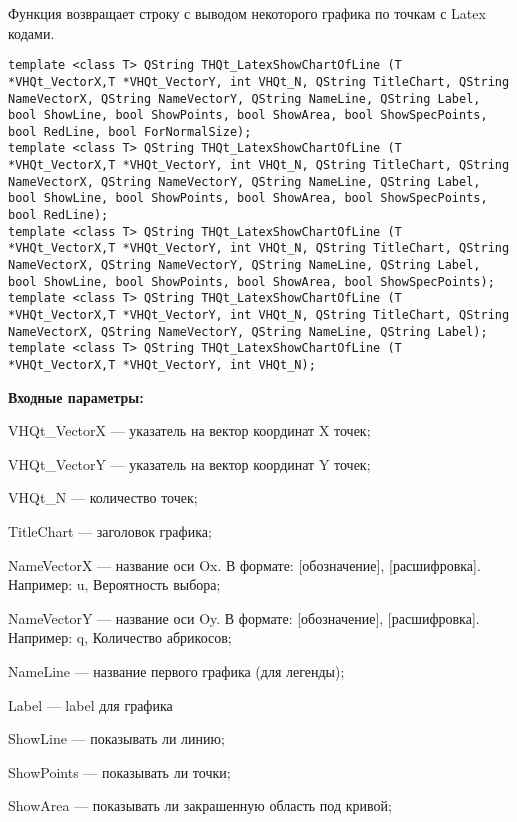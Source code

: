 \documentclass[a4paper,12pt]{article}
\begin{document}
Функция возвращает строку с выводом некоторого графика по точкам с Latex кодами.


\begin{lstlisting}[label=code_syntax_THQt_LatexShowChartOfLine,caption=Синтаксис]
template <class T> QString THQt_LatexShowChartOfLine (T *VHQt_VectorX,T *VHQt_VectorY, int VHQt_N, QString TitleChart, QString NameVectorX, QString NameVectorY, QString NameLine, QString Label, bool ShowLine, bool ShowPoints, bool ShowArea, bool ShowSpecPoints, bool RedLine, bool ForNormalSize);
template <class T> QString THQt_LatexShowChartOfLine (T *VHQt_VectorX,T *VHQt_VectorY, int VHQt_N, QString TitleChart, QString NameVectorX, QString NameVectorY, QString NameLine, QString Label, bool ShowLine, bool ShowPoints, bool ShowArea, bool ShowSpecPoints, bool RedLine);
template <class T> QString THQt_LatexShowChartOfLine (T *VHQt_VectorX,T *VHQt_VectorY, int VHQt_N, QString TitleChart, QString NameVectorX, QString NameVectorY, QString NameLine, QString Label, bool ShowLine, bool ShowPoints, bool ShowArea, bool ShowSpecPoints);
template <class T> QString THQt_LatexShowChartOfLine (T *VHQt_VectorX,T *VHQt_VectorY, int VHQt_N, QString TitleChart, QString NameVectorX, QString NameVectorY, QString NameLine, QString Label);
template <class T> QString THQt_LatexShowChartOfLine (T *VHQt_VectorX,T *VHQt_VectorY, int VHQt_N);
\end{lstlisting}

\textbf{Входные параметры:}

VHQt\_VectorX --- указатель на вектор координат X точек;
 
VHQt\_VectorY --- указатель на вектор координат Y точек;
 
VHQt\_N --- количество точек;
 
TitleChart --- заголовок графика;
 
NameVectorX --- название оси Ox. В формате: [обозначение], [расшифровка]. Например: u, Вероятность выбора;
 
NameVectorY --- название оси Oy. В формате: [обозначение], [расшифровка]. Например: q, Количество абрикосов;
 
NameLine --- название первого графика (для легенды);
 
Label --- label для графика
 
ShowLine --- показывать ли линию;
 
ShowPoints --- показывать ли точки;
 
ShowArea --- показывать ли закрашенную область под кривой;
 
\end{document}
